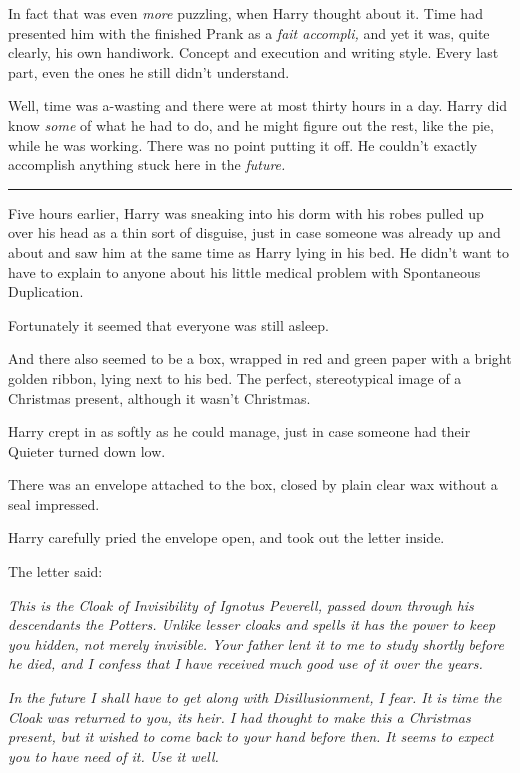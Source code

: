 In fact that was even \emph{more} puzzling, when Harry thought about it.
Time had presented him with the finished Prank as a \emph{fait
accompli,} and yet it was, quite clearly, his own handiwork. Concept and
execution and writing style. Every last part, even the ones he still
didn't understand.

Well, time was a-wasting and there were at most thirty hours in a day.
Harry did know \emph{some} of what he had to do, and he might figure out
the rest, like the pie, while he was working. There was no point putting
it off. He couldn't exactly accomplish anything stuck here in the
\emph{future.}

\begin{center}\rule{3in}{0.4pt}\end{center}

Five hours earlier, Harry was sneaking into his dorm with his robes
pulled up over his head as a thin sort of disguise, just in case someone
was already up and about and saw him at the same time as Harry lying in
his bed. He didn't want to have to explain to anyone about his little
medical problem with Spontaneous Duplication.

Fortunately it seemed that everyone was still asleep.

And there also seemed to be a box, wrapped in red and green paper with a
bright golden ribbon, lying next to his bed. The perfect, stereotypical
image of a Christmas present, although it wasn't Christmas.

Harry crept in as softly as he could manage, just in case someone had
their Quieter turned down low.

There was an envelope attached to the box, closed by plain clear wax
without a seal impressed.

Harry carefully pried the envelope open, and took out the letter inside.

The letter said:

\emph{This is the Cloak of Invisibility of Ignotus Peverell, passed down
through his descendants the Potters. Unlike lesser cloaks and spells it
has the power to keep you hidden, not merely invisible. Your father lent
it to me to study shortly before he died, and I confess that I have
received much good use of it over the years.}

\emph{In the future I shall have to get along with Disillusionment, I
fear. It is time the Cloak was returned to you, its heir. I had thought
to make this a Christmas present, but it wished to come back to your
hand before then. It seems to expect you to have need of it. Use it
well.}

